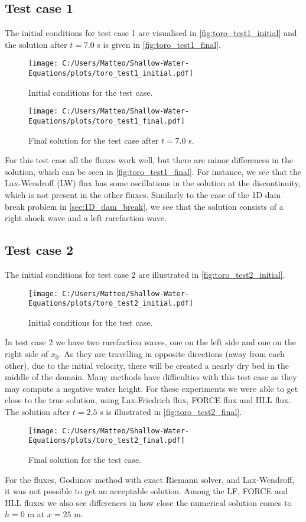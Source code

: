 \subsection*{Test case 1}
The initial conditions for test case 1 are visualised in \autoref{fig:toro_test1_initial} and the solution after $t=7.0$ s is given in \autoref{fig:toro_test1_final}.
\begin{figure}[H]
    \centering
    \texttt{[image: C:/Users/Matteo/Shallow-Water-Equations/plots/toro\_test1\_initial.pdf]}
    \caption{Initial conditions for the test case.}\label{fig:toro_test1_initial}
\end{figure}
\begin{figure}[H]
    \centering
    \texttt{[image: C:/Users/Matteo/Shallow-Water-Equations/plots/toro\_test1\_final.pdf]}
    \caption{Final solution for the test case after $t=7.0$ s.}\label{fig:toro_test1_final}
\end{figure}
For this test case all the fluxes work well, but there are minor differences in the solution, which can be seen in \autoref{fig:toro_test1_final}.
For instance, we see that the Lax-Wendroff (LW) flux has some oscillations in the solution at the discontinuity, which is not present in the other fluxes.
Similarly to the case of the 1D dam break problem in \autoref{sec:1D_dam_break}, we see that the solution consists of a right shock wave and a left rarefaction wave.


\subsection*{Test case 2}
The initial conditions for test case 2 are illustrated in \autoref{fig:toro_test2_initial}.
\begin{figure}[H]
    \centering
    \texttt{[image: C:/Users/Matteo/Shallow-Water-Equations/plots/toro\_test2\_initial.pdf]}
    \caption{Initial conditions for the test case.}\label{fig:toro_test2_initial}
\end{figure}
In test case 2 we have two rarefaction waves, one on the left side and one on the right side of $x_0$.
As they are travelling in opposite directions (away from each other), due to the initial velocity, there will be created a nearly dry bed in the middle of the domain.
Many methods have difficulties with this test case as they may compute a negative water height.
For these experiments we were able to get close to the true solution, using Lax-Friedrich flux, FORCE flux and HLL flux.
The solution after $t=2.5$ s is illustrated in \autoref{fig:toro_test2_final}.
\begin{figure}[H]
    \centering
    \texttt{[image: C:/Users/Matteo/Shallow-Water-Equations/plots/toro\_test2\_final.pdf]}
    \caption{Final solution for the test case.}\label{fig:toro_test2_final}
\end{figure}
For the fluxes, Godunov method with exact Riemann solver, and Lax-Wendroff, it was not possible to get an acceptable solution.
Among the LF, FORCE and HLL fluxes we also see differences in how close the numerical solution comes to $h = 0$ m at $x = 25$ m.


